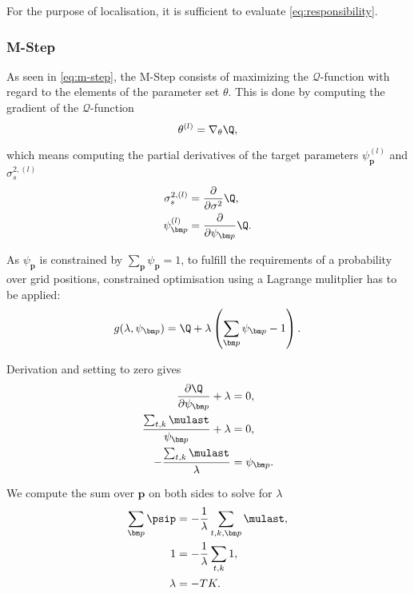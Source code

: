 For the purpose of localisation, it is sufficient to evaluate \eqref{eq:responsibility}.

\subsubsection*{M-Step}
As seen in \eqref{eq:m-step}, the M-Step consists of maximizing the $\mathcal{Q}$-function with regard to the elements of the parameter set $\theta$. This is done by computing the gradient of the $\mathcal{Q}$-function
\begin{equation}
\label{eq:m_step_theta_derivative}
    \theta^{(l)}=\nabla_\theta\Q,
\end{equation}

which means computing the partial derivatives of the target parameters $\psi_{\bm p}^{(l)}$ and $\sigma_s^{2,(l)}$
\begin{align}
    \label{eq:m_step_sigma_derivative}
    \sigma_{s}^{2, (l)}&=\frac{\partial}{\partial \sigma^2}\Q,\\
    \label{eq:m_step_psi_derivative}
    \psi_{\bm p}^{(l)}&=\frac{\partial}{\partial \psi_{\bm p}}\Q.
\end{align}

As $\psi_{\bm p}$ is constrained by $\sum_{\bm p}\psi_{\bm p}=1$, to fulfill the requirements of a probability over grid positions, constrained optimisation using a Lagrange mulitplier has to be applied:
\begin{equation}
    g(\lambda,\psi_{\bm p})=\Q+\lambda\left (\sum_{\bm p}\psi_{\bm p}-1\right ).
\end{equation}

Derivation and setting to zero gives
\begin{align}
    \frac{\partial\Q}{\partial\psi_{\bm p}}+\lambda &=0,\\
    \frac{\sum_{t,k}\mulast}{\psi_{\bm p}}+\lambda &=0,\\
    -\frac{\sum_{t,k}\mulast}{\lambda}&=\psi_{\bm p}\label{eq:psi-lambda}.
\end{align}

We compute the sum over $\bm p$ on both sides to solve for $\lambda$
\begin{align}
    \sum_{\bm p}\psip &=-\frac{1}{\lambda}\sum_{t,k,\bm p}\mulast,\\
    1&=-\frac{1}{\lambda}\sum_{t,k}1,\\
    \lambda &= -TK.\label{eq:lambda}
\end{align}

